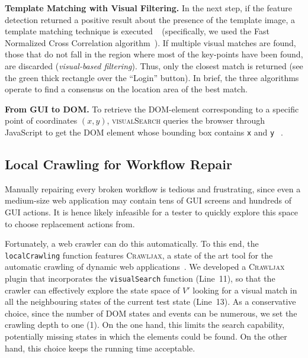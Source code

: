 \noindent
\textbf{Template Matching with Visual Filtering.}
In the next step, if the feature detection returned a positive result about the presence of the template image, a template matching technique is executed~\textcircled{} (specifically, we used the Fast Normalized Cross Correlation algorithm~\cite{briechle2001template}). 
If multiple visual matches are found, those that do not fall in the region where most of the key-points have been found, are discarded (\textit{visual-based filtering}). 
Thus, only the closest match is returned (see the green thick rectangle over the ``Login'' button). In brief, the three algorithms operate to find a consensus on the location area of the best match.

\noindent
\textbf{From GUI to DOM.}
To retrieve the DOM-element corresponding to a specific point of coordinates $(x,y)$, \textsc{visualSearch} queries the browser through JavaScript 
to get the DOM element whose bounding box contains \texttt{x} and \texttt{y}~\textcircled{}.


\subsection{Local Crawling for Workflow Repair}

Manually repairing every broken workflow is tedious and frustrating, since even a medium-size web application may contain tens of GUI screens and hundreds of GUI actions. It is hence likely infeasible for a tester to quickly explore this space to choose replacement actions from.

Fortunately, a web crawler can do this automatically. To this end, the \texttt{localCrawling} function features \textsc{Crawljax}, a state of the art tool for the automatic crawling of dynamic web applications~\cite{mesbah:tweb12,mesbah:tse12}. We developed a \textsc{Crawljax} plugin that incorporates the \texttt{visualSearch} function (Line~11), so that the crawler can effectively explore the state space of $V'$ looking for a visual match in all the neighbouring states of the current test state (Line~13). As a conservative choice, since the number of DOM states and events can be numerous, we set the crawling depth to one (1). On the one hand, this limits the search capability, potentially missing states in which the elements could be found. On the other hand, this choice keeps the running time acceptable.

